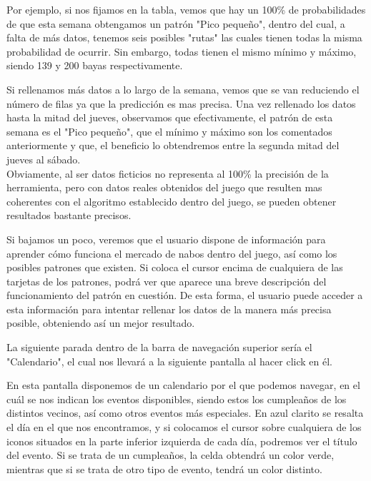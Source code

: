 Por ejemplo, si nos fijamos en la tabla, vemos que hay un 100\% de probabilidades de que esta semana obtengamos un patrón "Pico pequeño", dentro del cual, a falta de más datos, tenemos seis posibles "rutas" las cuales tienen todas la misma probabilidad de ocurrir. Sin embargo, todas tienen el mismo mínimo y máximo, siendo 139 y 200 bayas respectivamente.\\ 


Si rellenamos más datos a lo largo de la semana, vemos que se van reduciendo el número de filas ya que la predicción es mas precisa. Una vez rellenado los datos hasta la mitad del jueves, observamos que efectivamente, el patrón de esta semana es el "Pico pequeño", que el mínimo y  máximo son los comentados anteriormente y que, el beneficio lo obtendremos entre la segunda mitad del jueves al sábado.\\

Obviamente, al ser datos ficticios no representa al 100\% la precisión de la herramienta, pero con datos reales obtenidos del juego que resulten mas coherentes con el algoritmo establecido dentro del juego, se pueden obtener resultados bastante precisos.\\


Si bajamos un poco, veremos que el usuario dispone de información para aprender cómo funciona el mercado de nabos dentro del juego, así como los posibles patrones que existen. Si coloca el cursor encima de cualquiera de las tarjetas de los patrones, podrá ver que aparece una breve descripción del funcionamiento del patrón en cuestión. De esta forma, el usuario puede acceder a esta información para intentar rellenar los datos de la manera más precisa posible, obteniendo así un mejor resultado.\\


La siguiente parada dentro de la barra de navegación superior sería el "Calendario", el cual nos llevará a la siguiente pantalla al hacer click en él.\\


En esta pantalla disponemos de un calendario por el que podemos navegar, en el cuál se nos indican los eventos disponibles, siendo estos los cumpleaños de los distintos vecinos, así como otros eventos más especiales. En azul clarito se resalta el día en el que nos encontramos, y si colocamos el cursor sobre cualquiera de los iconos situados en la parte inferior izquierda de cada día, podremos ver el título del evento. Si se trata de un cumpleaños, la celda obtendrá un color verde, mientras que si se trata de otro tipo de evento, tendrá un color distinto.\\

